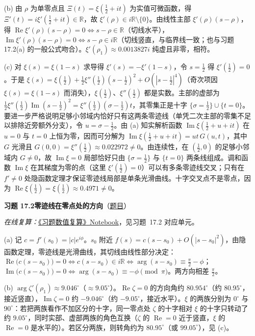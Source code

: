 \documentclass[11pt,a4paper]{article}
\newcommand{\RR}{\mathbb{R}}
\renewcommand{\Re}{\operatorname{Re}}
\renewcommand{\Im}{\operatorname{Im}}
\newcommand{\Sol}[2]{%
  \par\addvspace{1.2em}\noindent
  \hypertarget{s:#1}{}\textbf{习题 #1\quad #2}\hfill{\small（\hyperlink{q:#1}{题目}）}\par
  \nopagebreak\smallskip}
\begin{document}
(b) 由 $\rho$ 为单零点且 $\Xi(t)=\xi(\frac12+it)$ 为实值可微函数，得 $\Xi'(t)=i\xi'(\frac12+it)\in\RR$，故 $\xi'(\rho)\in i\RR\setminus\{0\}$。由线性主部 $\xi'(\rho)(s-\rho)$，得 $\Re\xi'(\rho)(s-\rho)=0\iff s-\rho\in\RR$（切线水平），$\Im\xi'(\rho)(s-\rho)=0\iff s-\rho\in i\RR$（切线竖直，与临界线一致；也与习题 17.2(a) 的一般公式吻合）。$\xi'(\rho_1)\approx0.0013827i$ 纯虚且非零，相符。

(c) 对 $\xi(s)=\xi(1-s)$ 求导得 $\xi'(s)=-\xi'(1-s)$，令 $s=\frac12$ 得 $\xi'(\frac12)=0$。于是
$\xi(s)=\xi(\frac12)+\frac12\xi''(\frac12)(s-\frac12)^2+O(|s-\frac12|^4)$（奇次项因 $\xi(s)=\xi(1-s)$ 而消失），$\xi(\frac12)$、$\xi''(\frac12)$ 都是实数。主部的虚部为
$\frac12\xi''(\frac12)\Im(s-\frac12)^2=\xi''(\frac12)(\sigma-\frac12)t$，其零集正是十字 $\{\sigma=\frac12\}\cup\{t=0\}$。
要进一步严格说明足够小邻域内恰好只有这两条零迹线（单凭二次主部的零集不足以排除近旁额外分支），令 $u=\sigma-\frac12$。由 (a) 知实解析函数 $\Im\xi(\frac12+u+it)$ 在 $u=0$ 与 $t=0$ 上恒为零，因而可分解为 $\Im\xi(\frac12+u+it)=ut\,G(u,t)$，其中 $G$ 光滑且 $G(0,0)=\xi''(\frac12)\approx0.022972\neq0$。由连续性，在 $(\frac12,0)$ 的足够小邻域内 $G\neq0$，故 $\Im\xi=0$ 局部恰好只由 $\{\sigma=\frac12\}$ 与 $\{t=0\}$ 两条线组成。调和函数 $\Im\xi$ 在其梯度为零的点（这里 $\xi'(\frac12)=0$）可以有多条零迹线交叉；只有在 $f'\neq0$ 处隐函数定理才保证零迹线局部是单条光滑曲线。十字交叉点不是零点，因为 $\Re\xi(\frac12)=\xi(\frac12)\approx0.4971\neq0$。

\Sol{17.2}{零迹线在零点处的方向}
\emph{在线复算：}\href{https://colab.research.google.com/github/lichengtong123/lichengtong-RH/blob/main/\%E4\%B9\%A0\%E9\%A2\%98\%E4\%B8\%8E\%E8\%A7\%A3\%E7\%AD\%94/\%E4\%B9\%A0\%E9\%A2\%98\%E6\%95\%B0\%E5\%80\%BC\%E5\%A4\%8D\%E7\%AE\%97.ipynb}{《习题数值复算》Notebook}，见习题~17.2 对应单元。

(a) 记 $c=f'(s_0)=|c|e^{i\phi}$。$s_0$ 附近 $f(s)=c(s-s_0)+O(|s-s_0|^2)$，由隐函数定理，零迹线是光滑曲线，其切线由线性部分决定：
$\Re\bigl(c(s-s_0)\bigr)=0\iff c(s-s_0)\in i\RR\iff\arg(s-s_0)\equiv\frac\pi2-\phi$；
$\Im\bigl(c(s-s_0)\bigr)=0\iff\arg(s-s_0)\equiv-\phi\pmod\pi$。两方向相差 $\frac\pi2$。

(b) $\arg\zeta'(\rho_1)\approx9.046^\circ$（$\approx9.05^\circ$）。$\Re\zeta=0$ 的方向角约 $80.954^\circ$（约 $80.95^\circ$，接近竖直），$\Im\zeta=0$ 约 $-9.046^\circ$（约 $-9.05^\circ$，接近水平）。$\xi$ 的两族分别为 $0^\circ$ 与 $90^\circ$：若把两族看作不加区分的十字，同一零点处 $\zeta$ 的十字相对 $\xi$ 的十字只转动了约 $9.05^\circ$，同时实部、虚部两族的角色互换（$\zeta$ 的 $\Re=0$ 近于竖直，$\xi$ 的 $\Re=0$ 是水平的）。若区分两族，则转角约为 $80.95^\circ$（或 $99.05^\circ$），见 (c)。
\end{document}

